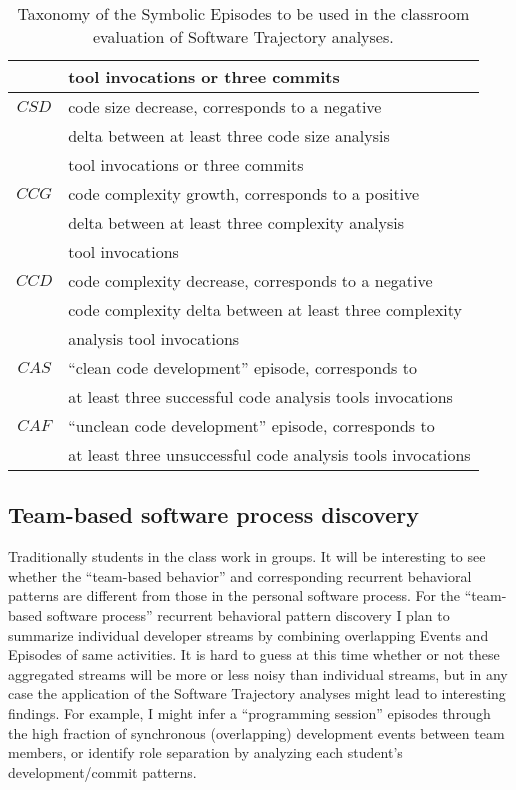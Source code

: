 \begin{table}
\begin{center}
\begin{tabular}{ | c | l | }
													& tool invocations or three commits \\
		\hline
		$CSD$ 								& code size decrease, corresponds to a negative \\
													& delta between at least three code size analysis \\
													& tool invocations or three commits \\																										
		\hline
		$CCG$ 								& code complexity growth, corresponds to a positive \\
													& delta between at least three complexity analysis \\
													& tool invocations \\
		\hline
		$CCD$ 								& code complexity decrease, corresponds to a negative \\
													& code complexity delta between at least three complexity \\
													& analysis tool invocations \\													
		\hline
		$CAS$ 								& ``clean code development'' episode, corresponds to \\
													& at least three successful code analysis tools invocations \\
		\hline
		$CAF$ 								& ``unclean code development'' episode, corresponds to \\
													& at least three unsuccessful code analysis tools invocations \\
		\hline		
	  \end{tabular}
    \caption{Taxonomy of the Symbolic Episodes to be used in the classroom evaluation of Software Trajectory analyses.}
    \label{fig:data_collected_intervals}
    \end{center}
\end{table}

\subsection{Team-based software process discovery}
Traditionally students in the class work in groups. It will be interesting to see whether the ``team-based behavior'' and corresponding recurrent behavioral patterns are different from those in the personal software process. For the ``team-based software process'' recurrent behavioral pattern discovery I plan to summarize individual developer streams by combining overlapping Events and Episodes of same activities. It is hard to guess at this time whether or not these aggregated streams will be more or less noisy than individual streams, but in any case the application of the Software Trajectory analyses might lead to interesting findings. For example, I might infer a ``programming session'' episodes through the high fraction of synchronous (overlapping) development events between team members, or identify role separation by analyzing each student's development/commit patterns.
